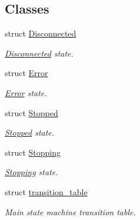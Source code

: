 \subsection*{Classes}
\begin{DoxyCompactItemize}
\item 
struct \hyperlink{structmdt_usbtmc_transfer_handler_state_machine_1_1_state_machine___1_1_disconnected}{Disconnected}
\begin{DoxyCompactList}\small\item\em \hyperlink{structmdt_usbtmc_transfer_handler_state_machine_1_1_state_machine___1_1_disconnected}{Disconnected} state. \end{DoxyCompactList}\item 
struct \hyperlink{structmdt_usbtmc_transfer_handler_state_machine_1_1_state_machine___1_1_error}{Error}
\begin{DoxyCompactList}\small\item\em \hyperlink{structmdt_usbtmc_transfer_handler_state_machine_1_1_state_machine___1_1_error}{Error} state. \end{DoxyCompactList}\item 
struct \hyperlink{structmdt_usbtmc_transfer_handler_state_machine_1_1_state_machine___1_1_stopped}{Stopped}
\begin{DoxyCompactList}\small\item\em \hyperlink{structmdt_usbtmc_transfer_handler_state_machine_1_1_state_machine___1_1_stopped}{Stopped} state. \end{DoxyCompactList}\item 
struct \hyperlink{structmdt_usbtmc_transfer_handler_state_machine_1_1_state_machine___1_1_stopping}{Stopping}
\begin{DoxyCompactList}\small\item\em \hyperlink{structmdt_usbtmc_transfer_handler_state_machine_1_1_state_machine___1_1_stopping}{Stopping} state. \end{DoxyCompactList}\item 
struct \hyperlink{structmdt_usbtmc_transfer_handler_state_machine_1_1_state_machine___1_1transition__table}{transition\-\_\-table}
\begin{DoxyCompactList}\small\item\em Main state machine transition table. \end{DoxyCompactList}\end{DoxyCompactItemize}
